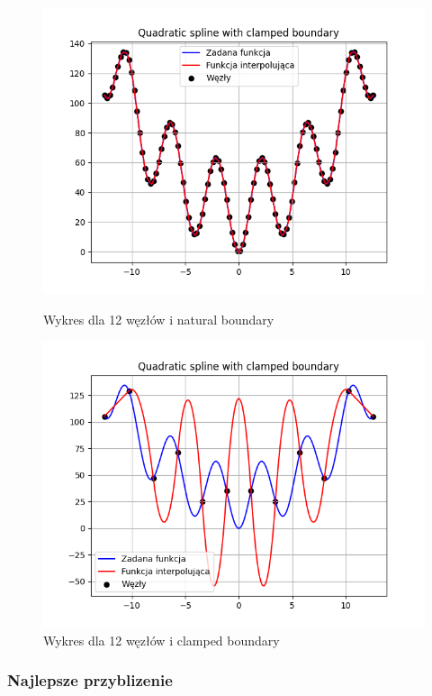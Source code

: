 \documentclass{article}
\begin{document}
\begin{figure}[H]
  \begin{minipage}[b]{0.49\textwidth}
    \includegraphics[width=\textwidth]{img22.png}
    \caption{Wykres dla 12 węzłów i natural boundary}
  \end{minipage}
  \hfill
  \begin{minipage}[b]{0.49\textwidth}
    \includegraphics[width=\textwidth]{img23.png}
    \caption{Wykres dla 12 węzłów  i clamped boundary}
  \end{minipage}
\end{figure}

\subsubsection{Najlepsze przyblizenie}
\end{document}
